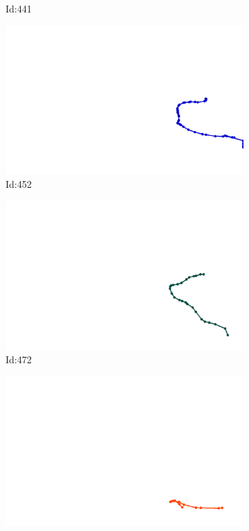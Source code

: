 \documentclass[12pt,twoside]{report}
\begin{document}
\begin{figure}
\begin{subfigure}[b]{0.20\textwidth}
\caption{Id:441}
\end{subfigure}
\begin{subfigure}[b]{0.20\textwidth}
\centering
\includegraphics[width=\textwidth]{../trajectories/452.png}
\caption{Id:452}
\end{subfigure}
\begin{subfigure}[b]{0.20\textwidth}
\centering
\includegraphics[width=\textwidth]{../trajectories/472.png}
\caption{Id:472}
\end{subfigure}
\begin{subfigure}[b]{0.20\textwidth}
\centering
\includegraphics[width=\textwidth]{../trajectories/482.png}

\end{subfigure}
\end{figure}
\end{document}
